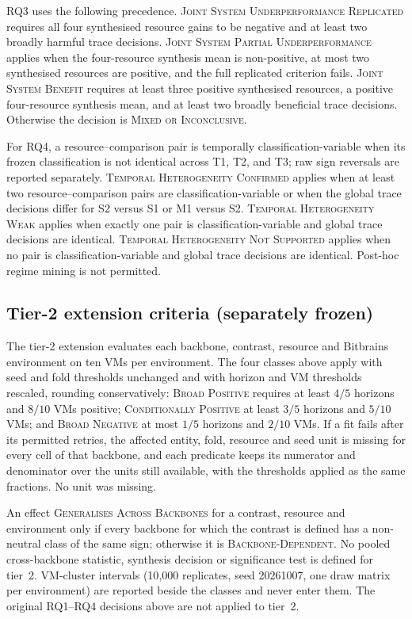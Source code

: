 \documentclass[a4paper,11pt]{article}
\begin{document}
RQ3 uses the following precedence.  \textsc{Joint System Underperformance
Replicated} requires all four synthesised resource gains to be negative and at
least two broadly harmful trace decisions.  \textsc{Joint System Partial
Underperformance} applies when the four-resource synthesis mean is non-positive,
at most two synthesised resources are positive, and the full replicated
criterion fails.  \textsc{Joint System Benefit} requires at least three
positive synthesised resources, a positive four-resource synthesis mean, and at
least two broadly beneficial trace decisions.  Otherwise the decision is
\textsc{Mixed or Inconclusive}.

For RQ4, a resource--comparison pair is temporally classification-variable when
its frozen classification is not identical across T1, T2, and T3; raw sign
reversals are reported separately.  \textsc{Temporal Heterogeneity Confirmed}
applies when at least two resource--comparison pairs are classification-variable
or when the global trace decisions differ for S2 versus S1 or M1 versus S2.
\textsc{Temporal Heterogeneity Weak} applies when exactly one pair is
classification-variable and global trace decisions are identical.
\textsc{Temporal Heterogeneity Not Supported} applies when no pair is
classification-variable and global trace decisions are identical.  Post-hoc
regime mining is not permitted.

\subsection*{Tier-2 extension criteria (separately frozen)}

The tier-2 extension evaluates each backbone, contrast, resource and Bitbrains
environment on ten VMs per environment. The four classes above apply with seed
and fold thresholds unchanged and with horizon and VM thresholds rescaled,
rounding conservatively: \textsc{Broad Positive} requires at least $4/5$
horizons and $8/10$ VMs positive; \textsc{Conditionally Positive} at least
$3/5$ horizons and $5/10$ VMs; and \textsc{Broad Negative} at most $1/5$
horizons and $2/10$ VMs. If a fit fails after its permitted retries, the
affected entity, fold, resource and seed unit is missing for every cell of
that backbone, and each predicate keeps its numerator and denominator over the
units still available, with the thresholds applied as the same fractions. No
unit was missing.

An effect \textsc{Generalises Across Backbones} for a contrast, resource and
environment only if every backbone for which the contrast is defined has a
non-neutral class of the same sign; otherwise it is \textsc{Backbone-Dependent}.
No pooled cross-backbone statistic, synthesis decision or significance test is
defined for tier~2. VM-cluster intervals (10{,}000 replicates, seed 20261007,
one draw matrix per environment) are reported beside the classes and never
enter them. The original RQ1--RQ4 decisions above are not applied to tier~2.
\clearpage
\end{document}
